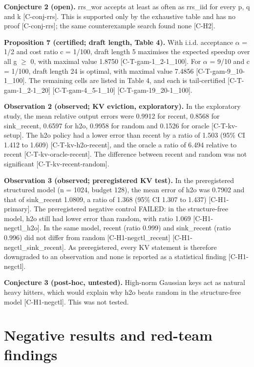 \documentclass[10pt,twocolumn]{article}
\begin{document}
\textbf{Conjecture 2 (open).} rrs\_wor accepts at least as often as rrs\_iid for every p, q and k {\scriptsize[C-conj-rrs]}. This is supported only by the exhaustive table and has no proof {\scriptsize[C-conj-rrs]}; the same counterexample search found none {\scriptsize[C-H2]}.

\textbf{Proposition 7 (certified; draft length, Table 4).} With i.i.d. acceptance $\alpha$ = 1/2 and cost ratio c = 1/100, draft length 5 maximises the expected speedup over all g $\ge$ 0, with maximal value 1.8750 {\scriptsize[C-T-gam-1\_2-1\_100]}. For $\alpha$ = 9/10 and c = 1/100, draft length 24 is optimal, with maximal value 7.4856 {\scriptsize[C-T-gam-9\_10-1\_100]}. The remaining cells are listed in Table 4, and each is tail-certified {\scriptsize[C-T-gam-1\_2-1\_20]} {\scriptsize[C-T-gam-4\_5-1\_10]} {\scriptsize[C-T-gam-19\_20-1\_100]}.

\textbf{Observation 2 (observed; KV eviction, exploratory).} In the exploratory study, the mean relative output errors were 0.9912 for recent, 0.8568 for sink\_recent, 0.6597 for h2o, 0.9958 for random and 0.1526 for oracle {\scriptsize[C-T-kv-setup]}. The h2o policy had a lower error than recent by a ratio of 1.503 (95\% CI 1.412 to 1.609) {\scriptsize[C-T-kv-h2o-recent]}, and the oracle a ratio of 6.494 relative to recent {\scriptsize[C-T-kv-oracle-recent]}. The difference between recent and random was not significant {\scriptsize[C-T-kv-recent-random]}.

\textbf{Observation 3 (observed; preregistered KV test).} In the preregistered structured model (n = 1024, budget 128), the mean error of h2o was 0.7902 and that of sink\_recent 1.0809, a ratio of 1.368 (95\% CI 1.307 to 1.437) {\scriptsize[C-H1-primary]}. The preregistered negative control FAILED: in the structure-free model, h2o still had lower error than random, with ratio 1.069 {\scriptsize[C-H1-negctl\_h2o]}. In the same model, recent (ratio 0.999) and sink\_recent (ratio 0.996) did not differ from random {\scriptsize[C-H1-negctl\_recent]} {\scriptsize[C-H1-negctl\_sink\_recent]}. As preregistered, every KV statement is therefore downgraded to an observation and none is reported as a statistical finding {\scriptsize[C-H1-negctl]}.

\textbf{Conjecture 3 (post-hoc, untested).} High-norm Gaussian keys act as natural heavy hitters, which would explain why h2o beats random in the structure-free model {\scriptsize[C-H1-negctl]}. This was not tested.

\section{Negative results and red-team findings}
\end{document}

